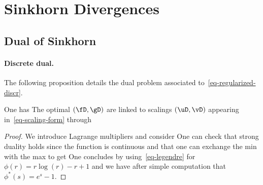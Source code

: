 
\section{Sinkhorn Divergences}

\subsection{Dual of Sinkhorn}

\paragraph{Discrete dual.}

The following proposition details the dual problem associated to~\eqref{eq-regularized-discr}.

\begin{prop}
One has
%
The optimal $(\fD,\gD)$ are linked to scalings $(\uD,\vD)$ appearing in~\eqref{eq-scaling-form} through 
\end{prop}

\begin{proof}
We introduce Lagrange multipliers and consider
One can check that strong duality holds since the function is continuous and that one can exchange the min with the max to get
One concludes by using~\eqref{eq-legendre} for $\phi(r)=r \log(r)-r+1$
and we have after simple computation that $\phi^*(s)=e^s-1$.
\end{proof}

